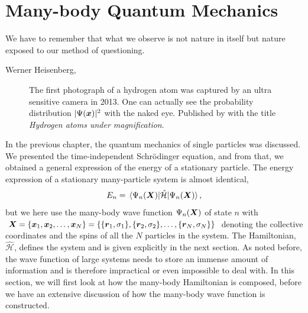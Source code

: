 \chapter{Many-body Quantum Mechanics} \label{chp:manybody}
\epigraph{We have to remember that what we observe is not nature in itself but
	nature exposed to our method of questioning.}{Werner Heisenberg, \supercite{heisenberg_across_1990}}
\begin{figure}[H]
	\centering
	\captionsetup[subfigure]{labelformat=empty}
	\caption{The first photograph of a hydrogen atom was captured by an ultra sensitive camera in 2013. One can actually see the probability distribution $|\Psi(\boldsymbol{{x}})|^2$ with the naked eye. Published by \citet{stodolna_hydrogen_2013} with the title \textit{Hydrogen atoms under magnification}.}
\end{figure}

\sloppy
In the previous chapter, the quantum mechanics of single particles was discussed. We presented the time-independent Schrödinger equation, and from that, we obtained a general expression of the energy of a stationary particle. The energy expression of a stationary many-particle system is almost identical,
\begin{equation}
E_n=\mel{\Psi_n(\bs{X})}{\hat{\mathcal{H}}}{\Psi_n(\bs{X})},
\label{eq:energy}
\end{equation}
but we here use the many-body wave function $\Psi_n(\boldsymbol{{X}})$ of state $n$ with $\boldsymbol{{X}}=\{\boldsymbol{{x}}_1,\boldsymbol{{x}}_2,\hdots,\boldsymbol{{x}}_N\}=\{\{\boldsymbol{{r}}_1, \sigma_1\}, \{\boldsymbol{{r}}_2, \sigma_2\},\hdots,\{\boldsymbol{{r}}_N, \sigma_N\}\}$ denoting the collective coordinates and the spins of all the $N$ particles in the system. The Hamiltonian, $\hat{\mathcal{H}}$, defines the system and is given explicitly in the next section. As noted before, the wave function of large systems needs to store an immense amount of information and is therefore impractical or even impossible to deal with. In this section, we will first look at how the many-body Hamiltonian is composed, before we have an extensive discussion of how the many-body wave function is constructed.


